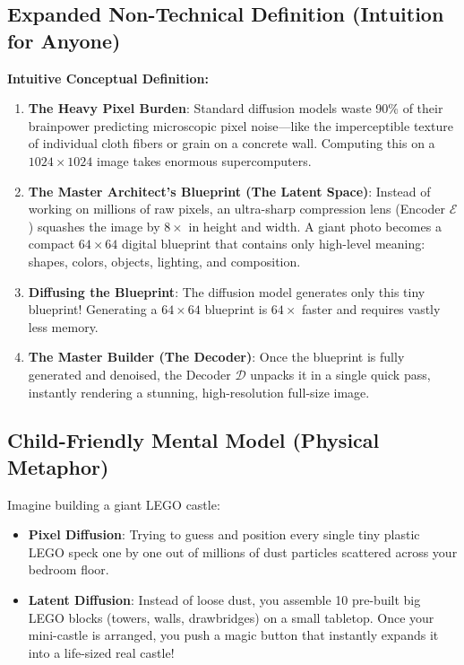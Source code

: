 \documentclass[11pt,a4paper]{article}
\theoremstyle{definition}
\begin{document}
\subsection{Expanded Non-Technical Definition (Intuition for Anyone)}
\textbf{Intuitive Conceptual Definition:}
\begin{enumerate}
    \item \textbf{The Heavy Pixel Burden}: Standard diffusion models waste 90\% of their brainpower predicting microscopic pixel noise—like the imperceptible texture of individual cloth fibers or grain on a concrete wall. Computing this on a $1024 \times 1024$ image takes enormous supercomputers.
    \item \textbf{The Master Architect's Blueprint (The Latent Space)}: Instead of working on millions of raw pixels, an ultra-sharp compression lens (Encoder $\mathcal{E}$) squashes the image by $8\times$ in height and width. A giant photo becomes a compact $64 \times 64$ digital blueprint that contains only high-level meaning: shapes, colors, objects, lighting, and composition.
    \item \textbf{Diffusing the Blueprint}: The diffusion model generates only this tiny blueprint! Generating a $64 \times 64$ blueprint is $64\times$ faster and requires vastly less memory.
    \item \textbf{The Master Builder (The Decoder)}: Once the blueprint is fully generated and denoised, the Decoder $\mathcal{D}$ unpacks it in a single quick pass, instantly rendering a stunning, high-resolution full-size image.
\end{enumerate}

\subsection{Child-Friendly Mental Model (Physical Metaphor)}
Imagine building a giant LEGO castle:
\begin{itemize}
    \item \textbf{Pixel Diffusion}: Trying to guess and position every single tiny plastic LEGO speck one by one out of millions of dust particles scattered across your bedroom floor.
    \item \textbf{Latent Diffusion}: Instead of loose dust, you assemble 10 pre-built big LEGO blocks (towers, walls, drawbridges) on a small tabletop. Once your mini-castle is arranged, you push a magic button that instantly expands it into a life-sized real castle!
\end{itemize}
\end{document}
